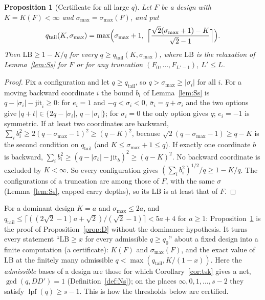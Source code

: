 \documentclass[11pt]{amsart}
\newtheorem{proposition}[theorem]{Proposition}
\theoremstyle{definition}
\theoremstyle{plain}
\begin{document}
\begin{proposition}[Certificate for all large $q$]\label{prop:Dprime}
Let $F$ be a design with $K=K(F)<\infty$ and $\sigma_{\max}=\sigma_{\max}(F)$, and put
\[
q_{\mathrm{tail}}(K,\sigma_{\max})=\max\Bigl(\sigma_{\max}+1,\ \Bigl\lceil\frac{\sqrt2(\sigma_{\max}+1)-K}{\sqrt2-1}\Bigr\rceil\Bigr).
\]
Then $\mathrm{LB}\ge1-K/q$ for every $q\ge q_{\mathrm{tail}}(K,\sigma_{\max})$, where $\mathrm{LB}$ is the relaxation of Lemma~\ref{lem:Ss} for $F$ or for any truncation $(F_0,\dots,F_{L'-1})$, $L'\le L$.
\end{proposition}

\begin{proof}
Fix a configuration and let $q\ge q_{\mathrm{tail}}$, so $q>\sigma_{\max}\ge|\sigma_i|$ for all $i$. For a moving backward coordinate $i$ the bound $b_i$ of Lemma~\ref{lem:Ss} is $q-|\sigma_i|-\mathrm{jit}_i\ge0$: for $e_i=1$ and $-q<\sigma_i<0$, $\bar\sigma_i=q+\sigma_i$ and the two options give $|q+t|\in\{2q-|\sigma_i|,\,q-|\sigma_i|\}$; for $\sigma_i=0$ the only option gives $q$; $e_i=-1$ is symmetric. If at least two coordinates are backward, $\sum_ib_i^2\ge2(q-\sigma_{\max}-1)^2\ge(q-K)^2$, because $\sqrt2(q-\sigma_{\max}-1)\ge q-K$ is the second condition on $q_{\mathrm{tail}}$ (and $K\le\sigma_{\max}+1\le q$). If exactly one coordinate $b$ is backward, $\sum_ib_i^2\ge(q-|\sigma_b|-\mathrm{jit}_b)^2\ge(q-K)^2$. No backward coordinate is excluded by $K<\infty$. So every configuration gives $(\sum_ib_i^2)^{1/2}/q\ge1-K/q$. The configurations of a truncation are among those of $F$, with the same $\sigma$ (Lemma~\ref{lem:Ss}, capped carry depths), so its $\mathrm{LB}$ is at least that of $F$.
\end{proof}

For a dominant design $K=a$ and $\sigma_{\max}\le2a$, and $q_{\mathrm{tail}}\le\lceil((2\sqrt2-1)a+\sqrt2)/(\sqrt2-1)\rceil<5a+4$ for $a\ge1$: Proposition~\ref{prop:Dprime} is the proof of Proposition~\ref{prop:D} without the dominance hypothesis. It turns every statement ``$\mathrm{LB}\ge x$ for every admissible $q\ge q_0$'' about a fixed design into a finite computation (a certificate): $K(F)$ and $\sigma_{\max}(F)$, and the exact value of $\mathrm{LB}$ at the finitely many admissible $q<\max(q_{\mathrm{tail}},K/(1-x))$. Here the \emph{admissible} bases of a design are those for which Corollary~\ref{cor:tsk} gives a net, $\gcd(q,DD')=1$ (Definition~\ref{def:Ns}); on the places $\infty,0,1,\dots,s-2$ they satisfy $\operatorname{lpf}(q)\ge s-1$. This is how the thresholds below are certified.
\end{document}
